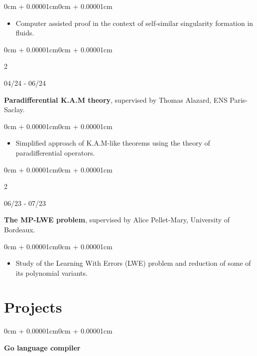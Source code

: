 \documentclass[10pt, letterpaper]{article}
\newenvironment{highlights}{
    \begin{itemize}[
        topsep=0.10cm,
        parsep=0.10cm,
        partopsep=0pt,
        itemsep=0pt,
        leftmargin=0cm + 10pt
    ]
}{
    \end{itemize}
}
\newenvironment{onecolentry}{
    \begin{adjustwidth}{0cm + 0.00001cm}{0cm + 0.00001cm}
}{
    \end{adjustwidth}
}
\newenvironment{twocolentry}[2][]{
    \onecolentry
    \def\firstColumn{#2}
    \setcolumnwidth{2.3cm, \fill}
    \begin{paracol}{2}
    \raggedright \firstColumn \switchcolumn
}{
    \end{paracol}
    \endonecolentry
}
\begin{document}
\vspace{0.10cm}
\begin{onecolentry}
    \begin{highlights}
        \item Computer assisted proof in the context of self-similar singularity formation in fluids.
    \end{highlights}
\end{onecolentry}

\vspace{0.2cm}

\begin{twocolentry}{04/24 - 06/24}
    \textbf{Paradifferential K.A.M theory}, supervised by Thomas Alazard, ENS Paris-Saclay.
\end{twocolentry}

\vspace{0.10cm}
\begin{onecolentry}
    \begin{highlights}
        \item Simplified approach of K.A.M-like theorems using the theory of paradifferential operators.
    \end{highlights}
\end{onecolentry}

\vspace{0.2cm}

\begin{twocolentry}{06/23 - 07/23}
    \textbf{The MP-LWE problem}, supervised by Alice Pellet-Mary, University of Bordeaux.
\end{twocolentry}

\vspace{0.10cm}
\begin{onecolentry}
    \begin{highlights}
        \item Study of the Learning With Errors (LWE) problem and reduction of some of its polynomial variants.
    \end{highlights}
\end{onecolentry}

\vspace{0.2cm}

\section{Projects}

\begin{onecolentry}
    \textbf{Go language compiler}
\end{onecolentry}
\end{document}
